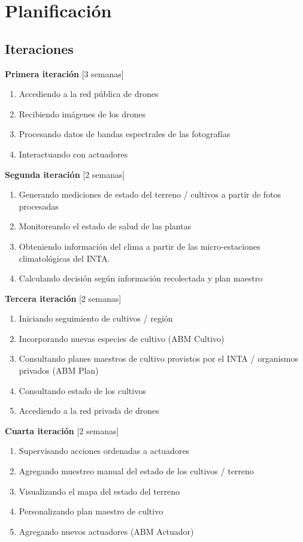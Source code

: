 
\section{Planificación}

\subsection{Iteraciones}

\textbf{Primera iteración} [3 semanas]
	\begin{enumerate} \itemsep -2pt
		\item Accediendo a la red pública de drones
		\item Recibiendo imágenes de los drones
		\item Procesando datos de bandas espectrales de las fotografías
		\item Interactuando con actuadores
	\end{enumerate}

\textbf{Segunda iteración} [2 semanas]
	\begin{enumerate} \itemsep -2pt
		\item Generando mediciones de estado del terreno / cultivos a partir de fotos procesadas
		\item Monitoreando el estado de salud de las plantas
		\item Obteniendo información del clima a partir de las micro-estaciones climatológicas del INTA.
		\item Calculando decisión según información recolectada y plan maestro
	\end{enumerate}

\textbf{Tercera iteración} [2 semanas]
	\begin{enumerate} \itemsep -2pt
		\item Iniciando seguimiento de cultivos / región
		\item Incorporando nuevas especies de cultivo (ABM Cultivo)
		\item Consultando planes maestros de cultivo provistos por el INTA / organismos privados (ABM Plan)
		\item Consultando estado de los cultivos
		\item Accediendo a la red privada de drones
	\end{enumerate}

\textbf{Cuarta iteración} [2 semanas]
	\begin{enumerate} \itemsep -2pt
		\item Supervisando acciones ordenadas a actuadores
		\item Agregando muestreo manual del estado de los cultivos / terreno
		\item Visualizando el mapa del estado del terreno
		\item Personalizando plan maestro de cultivo
		\item Agregando nuevos actuadores (ABM Actuador)
	\end{enumerate}

